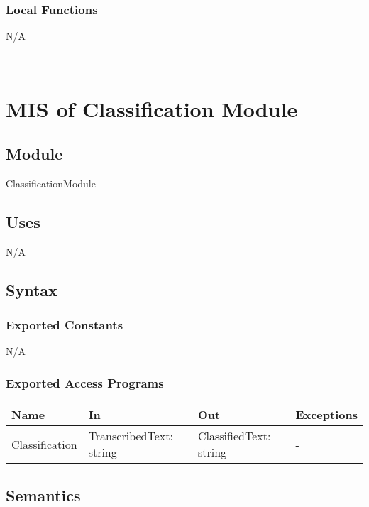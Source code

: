 \documentclass[12pt, titlepage]{article}
\begin{document}
\subsubsection{Local Functions}

N/A

\newpage
~\newpage
  
\section{MIS of Classification Module} \label{Classification_Module} 

\subsection{Module}

ClassificationModule

\subsection{Uses}

N/A

\subsection{Syntax}

\subsubsection{Exported Constants}

N/A

\subsubsection{Exported Access Programs}

\begin{center}
\begin{tabular}{p{2cm} p{4cm} p{4cm} p{2cm}}
\hline
\textbf{Name} & \textbf{In} & \textbf{Out} & \textbf{Exceptions} \\
\hline
Classification & TranscribedText: string & ClassifiedText: string & - & \\
\hline
\end{tabular}
\end{center}

\subsection{Semantics}
\end{document}
